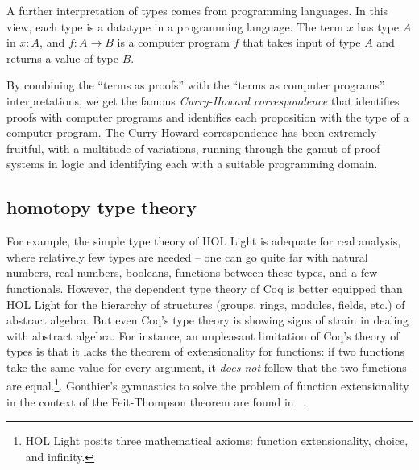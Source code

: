 \documentclass{llncs}
\begin{document}
A further interpretation of types comes from programming languages.
In this view, each type is a datatype in a programming language.  The
term $x$ has type $A$ in $x:A$, and $f:A\rightarrow B$ is a computer
program $f$ that takes input of type $A$ and returns a value of type
$B$.

By combining the ``terms as proofs'' with the ``terms as computer
programs'' interpretations, we get the famous {\it Curry-Howard
  correspondence} that identifies proofs with computer programs and
identifies each proposition with the type of a computer program.  The
Curry-Howard correspondence has been extremely fruitful, with a
multitude of variations, running through the gamut of proof systems in
logic and identifying each with a suitable programming domain.






\subsection{homotopy type theory}

For
example, the simple type theory of HOL Light is adequate for real
analysis, where relatively few types are needed -- one can go quite
far with natural numbers, real numbers, booleans, functions between
these types, and a few functionals.  However, the dependent type
theory of Coq is better equipped than HOL Light for the hierarchy of
structures (groups, rings, modules, fields, etc.) of abstract algebra.
But even Coq's type theory is showing signs of strain in dealing with
abstract algebra.  For instance, an unpleasant limitation of Coq's
theory of types is that it lacks the theorem of extensionality for
functions: if two functions take the same value for every argument, it
{\it does not} follow that the two functions are equal.\footnote{HOL Light
  posits three mathematical axioms: function extensionality, choice,
  and infinity.}.  Gonthier's gymnastics to solve the problem of
function extensionality in the context of the Feit-Thompson theorem
are found in ~\cite{XX}.
\end{document}
